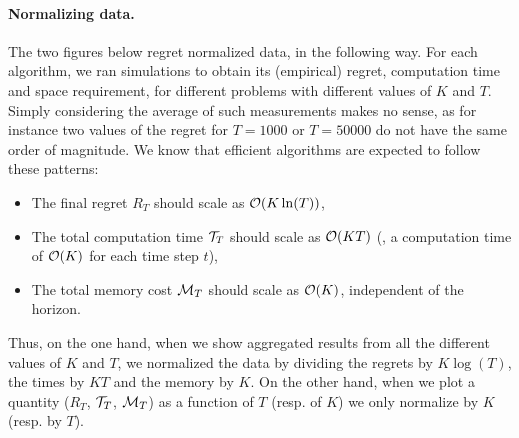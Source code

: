 \paragraph{Normalizing data.}
%
The two figures below regret normalized data, in the following way.
For each algorithm, we ran simulations to obtain its (empirical) regret, computation time and space requirement, for different problems with different values of $K$ and $T$.
Simply considering the average of such measurements makes no sense, as for instance two values of the regret for $T=1000$ or $T=50000$ do not have the same order of magnitude.
%
We know that efficient algorithms are expected to follow these patterns:
\begin{itemize}%
    \item The final regret $R_T$ should scale as $\mathcal{O}(K \ln(T))$,
    \item The total computation time $\mathcal{T}_T$ should scale as $\mathcal{O}(K T)$ (\ie, a computation time of $\mathcal{O}(K)$ for each time step $t$),
    \item The total memory cost $\mathcal{M}_T$ should scale as $\mathcal{O}(K)$, independent of the horizon.
\end{itemize}
Thus, on the one hand, when we show aggregated results from all the different values of $K$ and $T$, we normalized the data by dividing the regrets by $K \log(T)$, the times by $K T$ and the memory by $K$.
%
On the other hand, when we plot a quantity ($R_T$, $\mathcal{T}_T$, $\mathcal{M}_T$) as a function of $T$ (resp. of $K$) we only normalize by $K$ (resp. by $T$).





